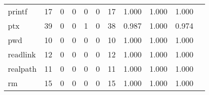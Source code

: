 \begin{longtable}{lp{1.2cm}p{1.2cm}p{1.2cm}p{1.2cm}p{1.2cm}p{1.2cm}p{1.2cm}p{1.2cm}p{1.2cm}p{1.2cm}}
printf    &                                    17 &                                                  0 &                                                  0 &                                                  0 &                                                  0 &                                                 17 &                                              1.000 &                                              1.000 &                                              1.000 \\
ptx       &                                    39 &                                                  0 &                                                  0 &                                                  1 &                                                  0 &                                                 38 &                                              0.987 &                                              1.000 &                                              0.974 \\
pwd       &                                    10 &                                                  0 &                                                  0 &                                                  0 &                                                  0 &                                                 10 &                                              1.000 &                                              1.000 &                                              1.000 \\
readlink  &                                    12 &                                                  0 &                                                  0 &                                                  0 &                                                  0 &                                                 12 &                                              1.000 &                                              1.000 &                                              1.000 \\
realpath  &                                    11 &                                                  0 &                                                  0 &                                                  0 &                                                  0 &                                                 11 &                                              1.000 &                                              1.000 &                                              1.000 \\
rm        &                                    15 &                                                  0 &                                                  0 &                                                  0 &                                                  0 &                                                 15 &                                              1.000 &                                              1.000 &                                              1.000 \\

\end{longtable}
